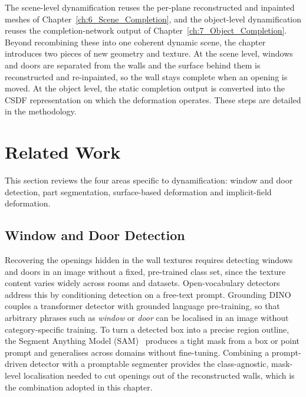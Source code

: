 The scene-level dynamification reuses the per-plane reconstructed and inpainted meshes of Chapter~\ref{ch:6_Scene_Completion}, and the object-level dynamification reuses the completion-network output of Chapter~\ref{ch:7_Object_Completion}. Beyond recombining these into one coherent dynamic scene, the chapter introduces two pieces of new geometry and texture. At the scene level, windows and doors are separated from the walls and the surface behind them is reconstructed and re-inpainted, so the wall stays complete when an opening is moved. At the object level, the static completion output is converted into the \gls{CSDF} representation on which the deformation operates. These steps are detailed in the methodology.


\section{Related Work}
\label{sec:8_related}

This section reviews the four areas specific to dynamification: window and door detection, part segmentation, surface-based deformation and implicit-field deformation.


\subsection{Window and Door Detection}
\label{sec:8_rw_detection}

Recovering the openings hidden in the wall textures requires detecting windows and doors in an image without a fixed, pre-trained class set, since the texture content varies widely across rooms and datasets. Open-vocabulary detectors address this by conditioning detection on a free-text prompt. Grounding DINO~\cite{liu_grounding_2024} couples a transformer detector with grounded language pre-training, so that arbitrary phrases such as \emph{window} or \emph{door} can be localised in an image without category-specific training. To turn a detected box into a precise region outline, the Segment Anything Model (SAM)~\cite{kirillov_segment_2023} produces a tight mask from a box or point prompt and generalises across domains without fine-tuning. Combining a prompt-driven detector with a promptable segmenter provides the class-agnostic, mask-level localisation needed to cut openings out of the reconstructed walls, which is the combination adopted in this chapter.


